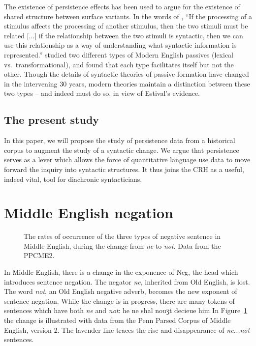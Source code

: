 \documentclass{article}
\begin{document}
The existence of persistence effects has been used to argue for the
existence of shared structure between surface variants.  In the words of
\textcite[490]{Branigan:1995}, “If the processing of a stimulus affects
the processing of another stimulus, then the two stimuli must be related
[...] if the relationship between the two stimuli is syntactic, then we
can use this relationship as a way of understanding what syntactic
information is represented.”  \textcite{Estival:1985} studied two
different types of Modern English passives (lexical vs.\
transformational),
and found that each type facilitates itself but not the other.
Though the details of syntactic theories of passive formation have
changed in the intervening 30 years, modern theories \parencite[such
as][]{Embick:2004} maintain a distinction between these two types – and
indeed must do so, in view of Estival’s evidence.


\subsection{The present study}
\label{sec:present-study}

In this paper, we will propose the study of persistence data from a
historical corpus to augment the study of a syntactic change.  We argue
that persistence serves as a lever which allows the force of
quantitative language use data to move forward the inquiry into
syntactic structures.  It thus joins the CRH as a useful, indeed vital,
tool for diachronic syntacticians.


\section{Middle English negation}
\label{sec:middle-engl-negat}

\begin{figure}
    \centering
    
    \caption{The rates of occurrence of the three types of negative sentence in Middle English, during the change from \emph{ne} to \emph{not}.  Data from the PPCME2.}
    \label{fig:three-lines}
\end{figure}

In Middle English, there is a change in the exponence of Neg, the head
which introduces sentence negation.  The negator \emph{ne}, inherited
from Old English, is lost.  The word \emph{not}, an Old English negative
adverb, becomes the new exponent of sentence negation.  While the change
is in progress, there are many tokens of sentences which have both
\emph{ne} and \emph{not}:
\ex
he ne shal nouʒt decieue him \trailingcitation{Early Prose Psalter,
    161:131:11, from \textcite{Frisch1997}}
\xe
In Figure~\ref{fig:three-lines} the change is illustrated with data from
the Penn Parsed Corpus of Middle English, version
2. \parencite[PPCME2][]{Kroch2001} The lavender line traces the rise and
disappearance of \emph{ne...not} sentences.
\end{document}
